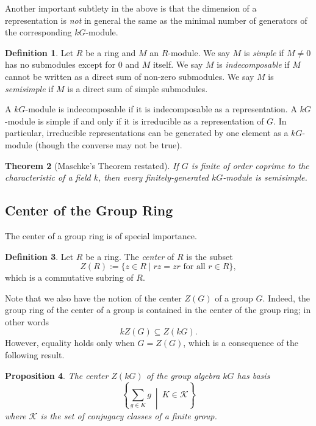 \documentclass[12pt]{article}
\theoremstyle{plain}
\newtheorem{theorem}{Theorem}[section]
\newtheorem{proposition}[theorem]{Proposition}
\theoremstyle{definition}
\newtheorem{definition}[theorem]{Definition}
\theoremstyle{remark}
\numberwithin{equation}{section}
\begin{document}
Another important subtlety in the above is that the dimension of a
representation is \emph{not} in general the same as the minimal number
of generators of the corresponding $kG$-module.

\begin{definition}
Let $R$ be a ring and $M$ an $R$-module.
We say $M$ is \emph{simple} if $M\ne 0$ has no submodules except for
$0$ and $M$ itself.
We say $M$ is \emph{indecomposable} if $M$ cannot be written as a direct sum of
non-zero submodules.
We say $M$ is \emph{semisimple} if $M$ is a direct sum of simple
submodules.
\end{definition}

A $kG$-module is indecomposable if it is indecomposable as a
representation.
A $kG$-module is simple if and only if it is irreducible
as a representation of $G$.
In particular, irreducible representations can be
generated by one element as a $kG$-module (though the converse may not
be true).

\begin{theorem}[Maschke's Theorem restated]
If $G$ is finite of order coprime to the characteristic of a field $k$,
then every finitely-generated $kG$-module is semisimple.
\end{theorem}

\subsection{Center of the Group Ring}

The center of a group ring is of special importance.

\begin{definition}
Let $R$ be a ring.
The \emph{center} of $R$ is the subset
\[
Z(R) := \{ z \in R \mid rz=zr \textrm{ for all } r \in R \},
\]
which is a commutative subring of $R$.
\end{definition}

Note that we also have the notion of the center $Z(G)$ of a group $G$.
Indeed, the group ring of the center of a group is contained in the
center of the group ring; in other words
\[
kZ(G) \subseteq Z(kG).
\]
However, equality holds only when $G=Z(G)$, which is a consequence of the
following result.

\begin{proposition}
The center $Z(kG)$ of the group algebra $kG$ has basis
\[
\left\{
\sum_{g \in K} g\ \middle|\ K \in \mathcal{K}
\right\}
\]
where $\mathcal{K}$ is the set of conjugacy classes of a finite group.
\end{proposition}
\end{document}
